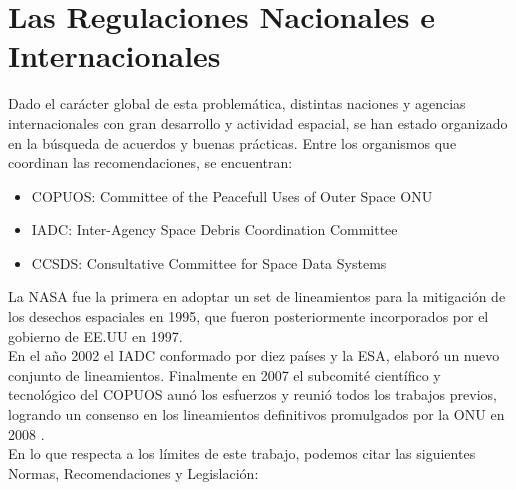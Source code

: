 


\section{Las Regulaciones Nacionales e Internacionales}

Dado el car\'acter global de esta problem\'atica, distintas naciones y agencias internacionales con gran desarrollo y actividad espacial, se han estado organizado en la b\'usqueda de acuerdos y buenas pr\'acticas. Entre los organismos que coordinan las recomendaciones, se encuentran:\\

\begin{itemize}
\item COPUOS: Committee of the Peacefull Uses of Outer Space \ac{ONU}
\item IADC: Inter-Agency Space Debris Coordination Committee
\item CCSDS: Consultative Committee for Space Data Systems
\end{itemize}

La NASA fue la primera en adoptar un set de lineamientos para la mitigaci\'on de los desechos espaciales en 1995, que fueron posteriormente incorporados por el gobierno de EE.UU en 1997.\\
En el a\~no 2002 el IADC conformado por diez pa\'ises y la ESA, elabor\'o un nuevo conjunto de lineamientos.
Finalmente en 2007 el subcomit\'e cient\'ifico y tecnol\'ogico del COPUOS aun\'o los esfuerzos y reuni\'o todos los trabajos previos, logrando un consenso en los lineamientos definitivos promulgados por la ONU en 2008 \citep{nasaprogramme}.\\

En lo que respecta a los l\'imites de este trabajo, podemos citar las siguientes Normas, Recomendaciones y Legislaci\'on:\\

